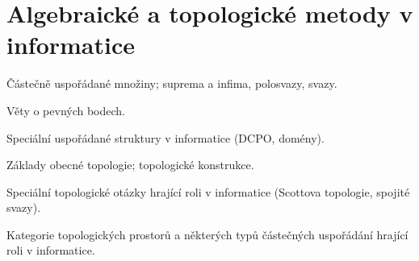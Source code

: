 \newpage
\section{Algebraické a topologické metody v informatice}
\begin{pozadavky}
\begin{pitemize}
\item Částečně uspořádané množiny; suprema a infima, polosvazy, svazy.
\item Věty o pevných bodech.
\item Speciální uspořádané struktury v informatice (DCPO, domény).
\item Základy obecné topologie; topologické konstrukce.
\item Speciální topologické otázky hrající roli v informatice (Scottova topologie, spojité svazy).
\item Kategorie topologických prostorů a některých typů částečných uspořádání hrající roli v informatice.
\end{pitemize}
\end{pozadavky}
